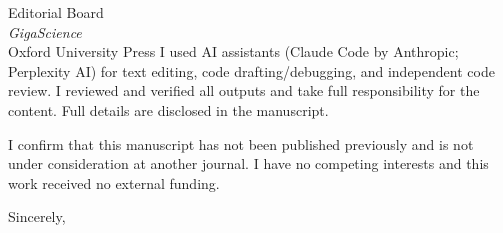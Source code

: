 \documentclass[11pt]{letter}
\begin{document}
\begin{letter}{Editorial Board \\ \emph{GigaScience} \\ Oxford University Press}
I used AI assistants (Claude Code by Anthropic; Perplexity AI) for text editing, code drafting/debugging, and independent code review. I reviewed and verified all outputs and take full responsibility for the content. Full details are disclosed in the manuscript.

I confirm that this manuscript has not been published previously and is not under consideration at another journal. I have no competing interests and this work received no external funding.

\closing{Sincerely,}

\end{letter}
\end{document}
